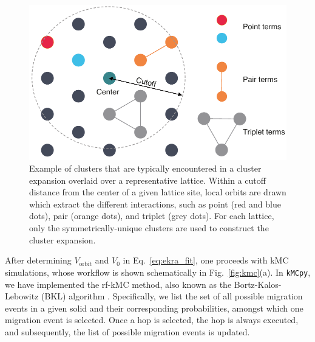 \documentclass[a4paper,fleqn]{cas-dc}
\begin{document}
{\begin{figure}[t]
    \centering
    \includegraphics[width=1.0\columnwidth]{Figures/Cluster.pdf}
    \caption{Example of clusters that are typically encountered in a cluster expansion overlaid over a representative lattice. Within a cutoff distance from the center of a given lattice site, local orbits are drawn which extract the different interactions, such as point (red and blue dots), pair (orange dots), and triplet (grey dots). For each lattice, only the symmetrically-unique clusters are used to construct the cluster expansion.}
    \label{fig:lce}
\end{figure}

After determining $V_{\mathrm{orbit}}$ and $V_0$ in Eq.~\ref{eq:ekra_fit}, one  proceeds with kMC simulations, whose workflow is shown schematically in Fig.~\ref{fig:kmc}(a). In \texttt{kMCpy}, we have implemented the rf-kMC method, also known as the Bortz-Kalos-Lebowitz (BKL) algorithm \cite{bortz_new_1975}. Specifically, we list the set of all possible migration events in a given solid and their corresponding probabilities, amongst which one migration event is selected. Once a hop is selected, the hop is always executed, and subsequently, the list of possible migration events is updated. 

}
\end{document}
